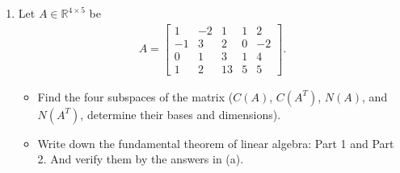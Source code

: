 \documentclass[a4paper,11pt]{article}
\begin{document}
\begin{enumerate}
\item Let $A\in\mathbb{R}^{4\times 5}$ be
\begin{align*}
A=\left[\begin{array}{cccccc} 1 & -2 &  1 & 1 & 2 \\
                             -1 &  3 &  2 & 0 & -2   \\
                              0 &  1 &  3 & 1 & 4 \\
                              1 &  2 & 13 & 5 & 5
   \end{array}\right].
\end{align*}
 \begin{itemize}
 \item[(a)] Find the four subspaces of the matrix ($C(A)$, $C(A^T)$, $N(A)$, and $N(A^T)$, determine their bases and dimensions).
   \item[(b)]
   Write down the fundamental theorem of linear algebra: Part 1 and Part 2. And verify them by the answers in (a).
 \end{itemize}




\end{enumerate}
\end{document}
